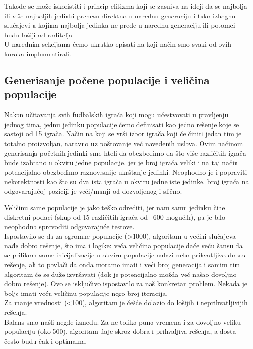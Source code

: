 \documentclass[a4paper]{article}
\begin{document}
Takođe se može iskoristiti i princip elitizma koji se zasniva na ideji da  se najbolja ili više najboljih jedinki prenesu direktno u narednu generaciju i tako izbegnu slučajevi u kojima najbolja jedinka ne pređe u narednu generaciju ili potomci budu lošiji od roditelja. \cite{genetskiAlgoritamAlicicMatf}. \\


U narednim sekcijama ćemo ukratko opisati na koji način smo svaki od ovih koraka implementirali.
\subsection{Generisanje počene populacije i veličina populacije}
Nakon učitavanja svih fudbalskih igrača koji mogu učestvovati u pravljenju jednog tima, jednu jedinku populacije ćemo definisati kao jedno rešenje koje se sastoji od 15 igrača. Način na koji se vrši izbor igrača koji će činiti jedan tim je totalno proizvoljan, naravno uz poštovanje već navedenih uslova. Ovim načinom generisanja početnih jedinki smo hteli da obezbedimo da što više različitih igrača bude izabrano u okviru jedne populacije, jer je broj igrača veliki i na taj način potencijalno obezbedimo raznovrsnije ukrštanje jedinki. Neophodno je i popraviti nekorektnosti kao što su dva ista igrača u okviru jedne iste jedinke, broj igrača na odgovarajućoj poziciji je veći/manji od dozvoljenog i slično.

Veličinu same populacije je jako teško odrediti, jer nam samu jedinku čine diskretni podaci (skup od 15 različitih igrača od ~600 mogućih), pa je bilo neophodno sprovoditi odgovarajuće testove.\\
Ispostavilo se da za ogromne populacije (>1000), algoritam u većini slučajeva nađe dobro rešenje, što ima i logike: veća veličina populacije daće veću šansu da se prilikom same inicijalizacije u okviru populacije nalazi neko prihvatljivo dobro rešenje, ali to povlači da onda moramo imati i veći broj generacija i samim tim algoritam će se duže izvršavati (dok je potencijalno možda već našao dovoljno dobro rešenje). Ovo se isključivo ispostavilo za naš konkretan problem. Nekada je bolje imati veću veličinu populacije nego broj iteracija. \cite{manyGenerations} \\
Za manje vrednosti (<100), algoritam je češće dolazio do lošijih i neprihvatljivijih rešenja. \\
Balans smo našli negde između. Za ne toliko puno vremena i za dovoljno veliku populaciju (oko 500), algoritam daje skroz dobra i prihvaljiva rešenja, a dosta često budu čak i optimalna. \cite{optimalPopulationSize}
\end{document}

